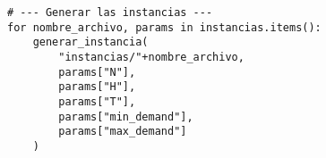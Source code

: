 \begin{lstlisting}[]
# --- Generar las instancias ---
for nombre_archivo, params in instancias.items():
    generar_instancia(
        "instancias/"+nombre_archivo,
        params["N"],
        params["H"],
        params["T"],        
        params["min_demand"],
        params["max_demand"]
    )
\end{lstlisting}
